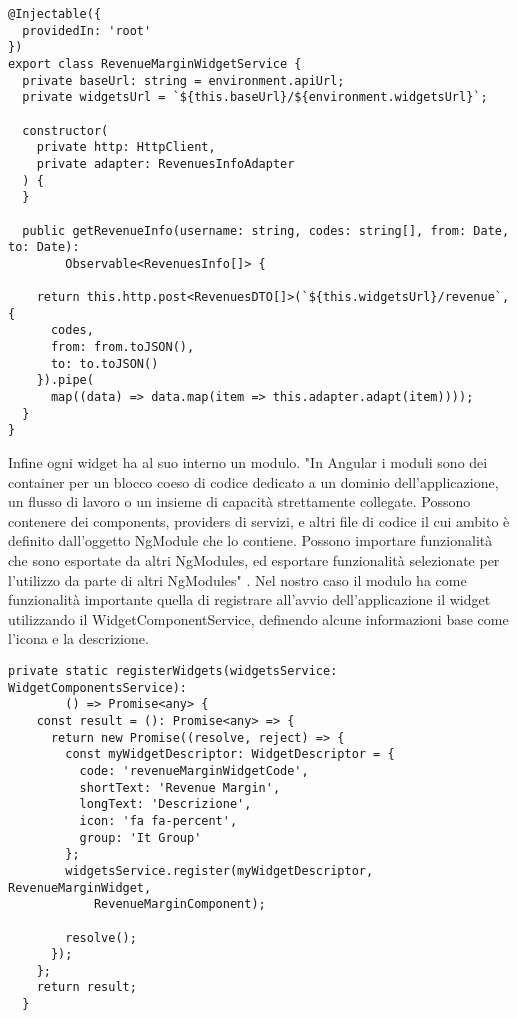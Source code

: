 \begin{lstlisting}[caption={File revenue-margin.service.ts}, style=javaScriptCode]
@Injectable({
  providedIn: 'root'
})
export class RevenueMarginWidgetService {
  private baseUrl: string = environment.apiUrl;
  private widgetsUrl = `${this.baseUrl}/${environment.widgetsUrl}`;

  constructor(
    private http: HttpClient,
    private adapter: RevenuesInfoAdapter
  ) {
  }

  public getRevenueInfo(username: string, codes: string[], from: Date, to: Date): 
        Observable<RevenuesInfo[]> {

    return this.http.post<RevenuesDTO[]>(`${this.widgetsUrl}/revenue`, {
      codes,
      from: from.toJSON(),
      to: to.toJSON()
    }).pipe(
      map((data) => data.map(item => this.adapter.adapt(item))));
  }
}
\end{lstlisting}
Infine ogni widget ha al suo interno un modulo. "In Angular i moduli sono dei container per un blocco coeso di codice dedicato a un dominio dell'applicazione, un flusso di lavoro o un insieme di capacità strettamente collegate. Possono contenere dei components, providers di servizi, e altri file di codice il cui ambito è definito dall'oggetto NgModule che lo contiene. Possono importare funzionalità che sono esportate da altri NgModules, ed esportare funzionalità selezionate per l'utilizzo da parte di altri NgModules" \cite{MODULE}. Nel nostro caso il modulo ha come funzionalità importante quella di registrare all'avvio dell'applicazione il widget utilizzando il WidgetComponentService, definendo alcune informazioni base come l'icona e la descrizione.

\begin{lstlisting}[caption={Metodo all'interno del modulo che registra il widget nel sistema}, style=javaScriptCode]
private static registerWidgets(widgetsService: WidgetComponentsService): 
        () => Promise<any> {
    const result = (): Promise<any> => {
      return new Promise((resolve, reject) => {
        const myWidgetDescriptor: WidgetDescriptor = {
          code: 'revenueMarginWidgetCode',
          shortText: 'Revenue Margin',
          longText: 'Descrizione',
          icon: 'fa fa-percent',
          group: 'It Group'
        };
        widgetsService.register(myWidgetDescriptor, RevenueMarginWidget, 
            RevenueMarginComponent);

        resolve();
      });
    };
    return result;
  }
\end{lstlisting}

